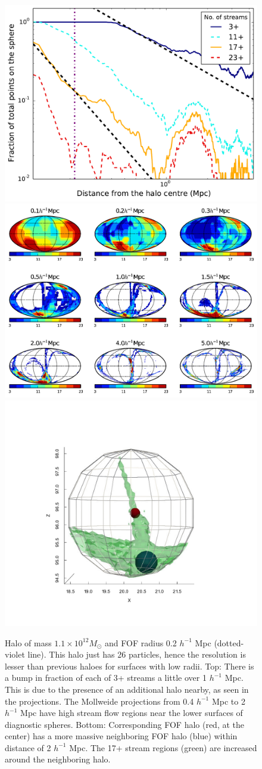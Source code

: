 \begin{figure}
\begin{minipage}[t]{.99\linewidth}
  \centering\includegraphics[width=10.cm]{Chapter3/Source_v2/fig10a}
\includegraphics[width=10.cm]{Chapter3/Source_v2/fig10b}
\includegraphics[width=6.cm]{Chapter3/Source_v2/fig10c}
\end{minipage}\hfill
\caption{Halo of mass $1.1 \times 10^{12} M_{\odot} $  and FOF radius 0.2 $h^{-1}$ Mpc (dotted-violet line). This halo just has 26 particles, hence the resolution is lesser than previous haloes for surfaces with low radii. Top: There is a bump in fraction of each of 3+ streams a little over 1 $h^{-1}$ Mpc. This is due to the presence of an additional halo nearby, as seen in the projections. The Mollweide projections from 0.4 $h^{-1}$ Mpc to 2 $h^{-1}$ Mpc have high stream flow regions near the lower surfaces of diagnostic spheres. Bottom: Corresponding FOF halo (red, at the center) has a more massive neighboring FOF halo (blue) within distance of 2 $h^{-1}$ Mpc. The 17+ stream regions (green) are increased around the neighboring halo.} 
\label{fig:4322}
\end{figure}

